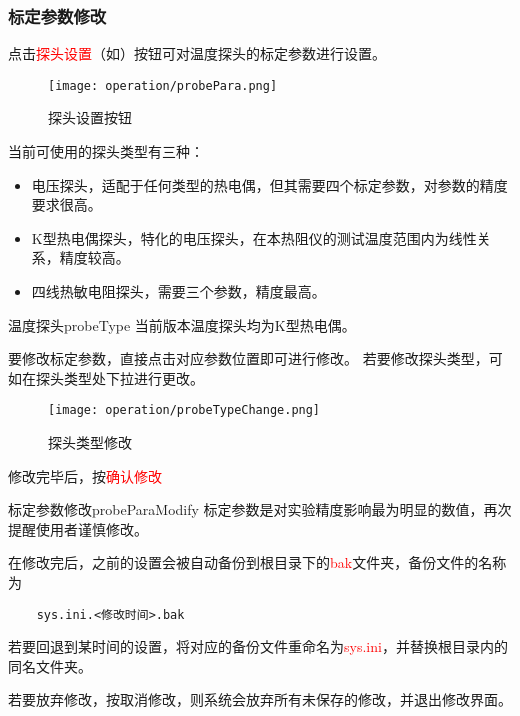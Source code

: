 \subsubsection*{标定参数修改}
点击\textcolor{red}{探头设置}（如）按钮可对温度探头的标定参数进行设置。
\begin{figure}[H]
    \centering
    \texttt{[image: operation/probePara.png]}
    \caption{  探头设置按钮 \label{fig:btnProbePara}}
\end{figure}
当前可使用的探头类型有三种：
\begin{itemize}
    \item 电压探头，适配于任何类型的热电偶，但其需要四个标定参数，对参数的精度要求很高。
    \item K型热电偶探头，特化的电压探头，在本热阻仪的测试温度范围内为线性关系，精度较高。
    \item 四线热敏电阻探头，需要三个参数，精度最高。
\end{itemize}
\begin{tips}{温度探头}{probeType}
    当前版本温度探头均为K型热电偶。
\end{tips}
要修改标定参数，直接点击对应参数位置即可进行修改。
若要修改探头类型，可如在探头类型处下拉进行更改。
\begin{figure}[H]
    \centering
    \texttt{[image: operation/probeTypeChange.png]}
    \caption{  探头类型修改 \label{fig:probeTypeChange}}
\end{figure}
修改完毕后，按\textcolor{red}{确认修改}
\begin{tips}{标定参数修改}{probeParaModify}
    标定参数是对实验精度影响最为明显的数值，再次提醒使用者谨慎修改。
\end{tips}
在修改完后，之前的设置会被自动备份到根目录下的\textcolor{red}{bak}文件夹，备份文件的名称为

\begin{lstlisting}
    sys.ini.<修改时间>.bak
\end{lstlisting}
若要回退到某时间的设置，将对应的备份文件重命名为\textcolor{red}{sys.ini}，并替换根目录内的同名文件夹。
\par 若要放弃修改，按取消修改，则系统会放弃所有未保存的修改，并退出修改界面。
